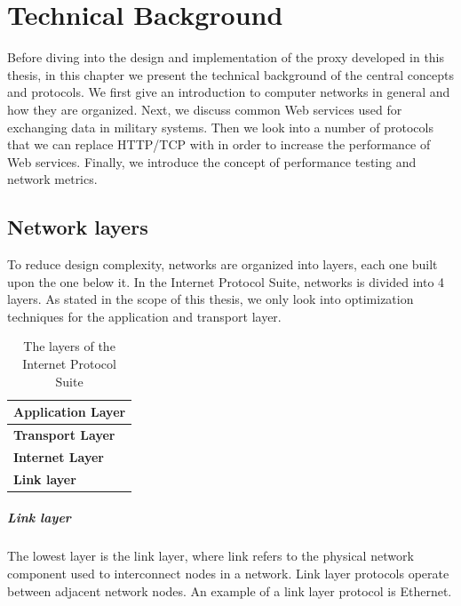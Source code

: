 \chapter{Technical Background}

Before diving into the design and implementation of the proxy developed in this
thesis, in this chapter we present the technical background of the central
concepts and protocols. We first give an introduction to computer networks in
general and how they are organized. Next, we discuss common Web services used
for exchanging data in military systems. Then we look into a number of protocols
that we can replace HTTP/TCP with in order to increase the performance of Web
services. Finally, we introduce the concept of performance testing and network
metrics.

\section{Network layers}

To reduce design complexity, networks are organized into layers, each one built
upon the one below it. In the Internet Protocol Suite\cite{rfc-1122}, networks
is divided into 4 layers. As stated in the scope of this thesis, we only look
into optimization techniques for the application and transport layer.

\begin{table}[h]
\begin{tabularx}{\textwidth}{| X |}
\hline
  \textbf{Application Layer} \\ \hline
  \textbf{Transport Layer} \\ \hline
  \textbf{Internet Layer} \\ \hline
  \textbf{Link layer} \\ \hline
\end{tabularx}
\caption{The layers of the Internet Protocol Suite}
\label{figure-network-layers}
\end{table}

\paragraph{Link layer}

The lowest layer is the link layer, where link refers to the physical
network component used to interconnect nodes in a network. Link layer protocols
operate between adjacent network nodes. An example of a link layer protocol is
Ethernet.

